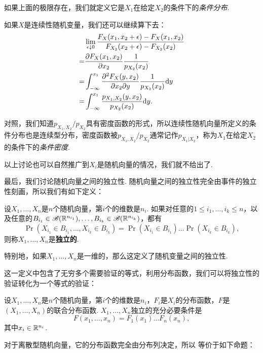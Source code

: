 如果上面的极限存在，我们就定义它是$X_1$在给定$X_2$的条件下的\textit{条件分布}. 

如果$X$是连续性随机变量，我们还可以继续算下去：
\begin{align*}
    &\lim_{\epsilon\downarrow 0}\frac{F_X(x_1,x_2+\epsilon)-F_X(x_1,x_2)}{F_{X_2}(x_2+\epsilon)-F_{X_2}(x_2)}\\
    =&\frac{\partial F_X(x_1,x_2)}{\partial x_2}\frac{1}{p_{X_2}(x_2)}\\
    =&\int_{-\infty}^{x_1}\frac{\partial^2 F_X(y,x_2)}{\partial x_2\partial y}\frac{1}{p_{X_2}(x_2)}\mathrm{d} y\\
    =&\int_{-\infty}^{x_1}\frac{p_{X_1,X_2}(y,x_2)}{p_{X_2}(x_2)}\mathrm{d} y.
\end{align*}

对照，我们知道$p_{X_1,X_2}/p_{X_2}$具有密度函数的形式，所以连续性随机向量所定义的条件分布也是连续型分布，密度函数被$p_{X_1,X_2}/p_{X_2}$通常记作$p_{X_1|X_2}$，称为$X_1$在给定$X_2$的条件下的\textit{条件密度}. 

以上讨论也可以自然推广到$X_i$是随机向量的情况，我们就不给出了. 

最后，我们讨论随机向量之间的独立性. 随机向量之间的独立性完全由事件的独立性刻画，所以我们有如下定义：

\begin{definition}[随机向量的独立性]
设$X_1,\dots,X_n$是$n$个随机向量，第$i$个的维数是$n_i$. 如果对任意的$1\leq i_1,\dots,i_k\leq n$，以及任意的$B_{i_1}\in\mathscr{B}(\mathbb{R}^{n_{i_1}}),\dots,B_{i_k}\in\mathscr{B}(\mathbb{R}^{n_{i_k}})$，都有
\[\Pr(X_{i_1}\in B_{i_1},\dots,X_{i_k}\in B_{i_k})=\Pr(X_{i_1}\in B_{i_1})\dots\Pr(X_{i_k}\in B_{i_k}),\]
则称$X_1,\dots,X_n$是\textbf{独立的}. 

特别地，如果$X_1,\dots,X_n$是一维的，那么这定义了随机变量之间的独立性. 
\end{definition}

这一定义中包含了无穷多个需要验证的等式，利用分布函数，我们可以将独立性的验证转化为一个等式的验证：

\begin{theorem}\label{theorem:independence}
设$X_1,\dots,X_n$是$n$个随机向量，第$i$个的维数是$n_i$，$F_i$是$X_i$的分布函数，$F$是$(X_1,\dots,X_n)$的联合分布函数. $X_1,\dots,X_n$独立的充分必要条件是
\[F(x_1,\dots,x_n)=F_1(x_1)\dots F_n(x_n),\]
其中$x_i\in\mathbb{R}^{n_i}$.
\end{theorem}

对于离散型随机向量，它的分布函数完全由分布列决定，所以 等价于如下命题：

